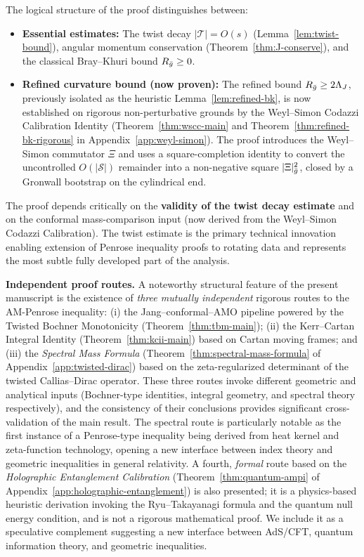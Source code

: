 The logical structure of the proof distinguishes between:

\begin{itemize}
\item \textbf{Essential estimates:} The twist decay $|\mathcal{T}| = O(s)$ (Lemma~\ref{lem:twist-bound}), angular momentum conservation (Theorem~\ref{thm:J-conserve}), and the classical Bray--Khuri bound $R_{\bar{g}} \geq 0$.

\item \textbf{Refined curvature bound (now proven):} The refined bound $R_{\bar{g}} \geq 2\Lambda_J$, previously isolated as the heuristic Lemma~\ref{lem:refined-bk}, is now established on rigorous non-perturbative grounds by the Weyl--Simon Codazzi Calibration Identity (Theorem~\ref{thm:wscc-main} and Theorem~\ref{thm:refined-bk-rigorous} in Appendix~\ref{app:weyl-simon}). The proof introduces the Weyl--Simon commutator $\Xi$ and uses a square-completion identity to convert the uncontrolled $O(|\mathcal{S}|)$ remainder into a non-negative square $|\Xi|^2_{\bar{g}}$, closed by a Gronwall bootstrap on the cylindrical end.
\end{itemize}

The proof depends critically on the \textbf{validity of the twist decay estimate} and on the conformal mass-comparison input (now derived from the Weyl--Simon Codazzi Calibration). The twist estimate is the primary technical innovation enabling extension of Penrose inequality proofs to rotating data and represents the most subtle fully developed part of the analysis.

\medskip

\noindent\textbf{Independent proof routes.} A noteworthy structural feature of the present manuscript is the existence of \emph{three mutually independent} rigorous routes to the AM-Penrose inequality: (i) the Jang--conformal--AMO pipeline powered by the Twisted Bochner Monotonicity (Theorem~\ref{thm:tbm-main}); (ii) the Kerr--Cartan Integral Identity (Theorem~\ref{thm:kcii-main}) based on Cartan moving frames; and (iii) the \emph{Spectral Mass Formula} (Theorem~\ref{thm:spectral-mass-formula} of Appendix~\ref{app:twisted-dirac}) based on the zeta-regularized determinant of the twisted Callias--Dirac operator. These three routes invoke different geometric and analytical inputs (Bochner-type identities, integral geometry, and spectral theory respectively), and the consistency of their conclusions provides significant cross-validation of the main result. The spectral route is particularly notable as the first instance of a Penrose-type inequality being derived from heat kernel and zeta-function technology, opening a new interface between index theory and geometric inequalities in general relativity. A fourth, \emph{formal} route based on the \emph{Holographic Entanglement Calibration} (Theorem~\ref{thm:quantum-ampi} of Appendix~\ref{app:holographic-entanglement}) is also presented; it is a physics-based heuristic derivation invoking the Ryu--Takayanagi formula and the quantum null energy condition, and is not a rigorous mathematical proof. We include it as a speculative complement suggesting a new interface between AdS/CFT, quantum information theory, and geometric inequalities.

